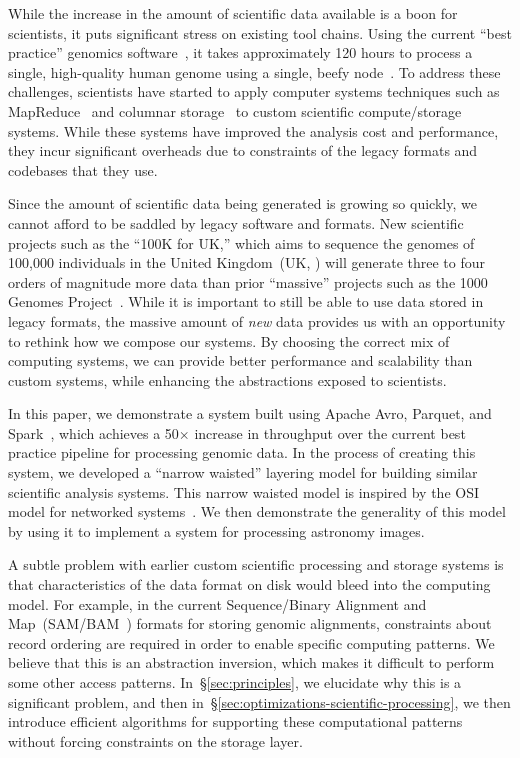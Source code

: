 \documentclass{acm_proc_article-sp}
\begin{document}
While the increase in the amount of scientific data available is a boon for scientists, it puts significant
stress on existing tool chains. Using the current ``best practice'' genomics software~\cite{auwera13}, it
takes approximately 120 hours to process a single, high-quality human genome using a single,
beefy node~\cite{talwalkar14}. To address these challenges, scientists have started to apply computer
systems techniques such as MapReduce~\cite{mckenna10, schatz09, langmead09} and columnar
storage~\cite{fritz11} to custom scientific compute/storage systems. While these systems have improved
the analysis cost and performance, they incur significant overheads due to constraints of the legacy
formats and codebases that they use.

Since the amount of scientific data being generated is growing so quickly, we cannot afford to be
saddled by legacy software and formats. New scientific projects such as the ``100K for UK,'' which aims
to sequence the genomes of 100,000 individuals in the United Kingdom~(UK, \cite{uk100k}) will
generate three to four orders of magnitude more data than prior ``massive'' projects such as the 1000
Genomes Project~\cite{siva08}. While it is important to still be able to use data stored in legacy formats,
the massive amount of \emph{new} data provides us with an opportunity to rethink how we compose
our systems. By choosing the correct mix of computing systems, we can provide better performance and
scalability than custom systems, while enhancing the abstractions exposed to scientists.

In this paper, we demonstrate a system built using Apache Avro, Parquet, and Spark~\cite{avro, parquet,
zaharia10}, which achieves a 50$\times$ increase in throughput over the current best practice pipeline
for processing genomic data. In the process of creating this system, we developed a ``narrow waisted''
layering model for building similar scientific analysis systems. This narrow waisted model is inspired by
the OSI model for networked systems~\cite{zimmermann80}. We then demonstrate the generality of this
model by using it to implement a system for processing astronomy images.

A subtle problem with earlier custom scientific processing and storage systems is that characteristics
of the data format on disk would bleed into the computing model. For example, in the current
Sequence/Binary Alignment and Map~(SAM/BAM~\cite{li09}) formats for storing genomic alignments,
constraints about record ordering are required in order to enable specific computing patterns. We
believe that this is an abstraction inversion, which makes it difficult to perform some other access
patterns. In~\S\ref{sec:principles}, we elucidate why this is a significant problem, and then
in~\S\ref{sec:optimizations-scientific-processing}, we then introduce efficient algorithms for supporting
these computational patterns without forcing constraints on the storage layer.
\end{document}

